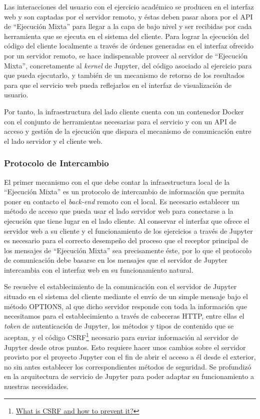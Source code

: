 Las interacciones del usuario con el ejercicio académico se producen en el interfaz web y son captadas por el servidor remoto, y éstas deben pasar ahora por el API de ``Ejecución Mixta'' para llegar a la capa de bajo nivel y ser recibidas por cada herramienta que se ejecuta en el sistema del cliente. Para lograr la ejecución del código del cliente localmente a través de órdenes generadas en el interfaz ofrecido por un servidor remoto, se hace indispensable proveer al servidor de ``Ejecución Mixta'', concretamente al \textit{kernel} de Jupyter, del código asociado al ejercicio para que pueda ejecutarlo, y también de un mecanismo de retorno de los resultados para que el servicio web pueda reflejarlos en el interfaz de visualización de usuario.

Por tanto, la infraestructura del lado cliente cuenta con un contenedor Docker con el conjunto de herramientas necesarias para el servicio y con un API de acceso y gestión de la ejecución que dispara el mecanismo de comunicación entre el lado servidor y el cliente web.

\subsubsection{Protocolo de Intercambio}

El primer mecanismo con el que debe contar la infraestructura local de la ``Ejecución Mixta'' es un protocolo de intercambio de información que permita poner en contacto el \textit{back-end} remoto con el local. Es necesario establecer un método de acceso que pueda usar el lado servidor web para conectarse a la ejecución que tiene lugar en el lado cliente. Al conservar el interfaz que ofrece el servidor web a su cliente y el funcionamiento de los ejercicios a través de Jupyter es necesario para el correcto desempeño del proceso que el receptor principal de los mensajes de ``Ejecución Mixta'' sea precisamente éste, por lo que el protocolo de comunicación debe basarse en los mensajes que el servidor de Jupyter intercambia con el interfaz web en su funcionamiento natural.

Se resuelve el establecimiento de la comunicación con el servidor de Jupyter situado en el sistema del cliente mediante el envío de un simple mensaje bajo el método OPTIONS, al que dicho servidor responde con toda la información que necesitamos para el establecimiento a través de cabeceras HTTP, entre ellas el \textit{token} de autenticación de Jupyter, los métodos y tipos de contenido que se aceptan, y el código CSRF\footnote{\href{https://www.geeksforgeeks.org/what-is-cross-site-request-forgery-csrf/}{What is CSRF and how to prevent it?}} necesario para enviar información al servidor de Jupyter desde otros puntos. Esto requiere hacer unos cambios sobre el servidor provisto por el proyecto Jupyter con el fin de abrir el acceso a él desde el exterior, no sin antes establecer los correspondientes métodos de seguridad. Se profundizó en la arquitectura de servicio de Jupyter para poder adaptar su funcionamiento a nuestras necesidades.


